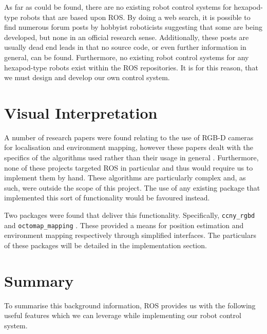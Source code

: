 As far as could be found, there are no existing robot control systems for hexapod-type robots that are based upon ROS. By doing a web search, it is possible to find numerous forum posts by hobbyist roboticists suggesting that some are being developed, but none in an official research sense. Additionally, these posts are usually dead end leads in that no source code, or even further information in general, can be found. Furthermore, no existing robot control systems for any hexapod-type robots exist within the ROS repositories. It is for this reason, that we must design and develop our own control system.


\section{Visual Interpretation}

A number of research papers were found relating to the use of RGB-D cameras for localisation and environment mapping, however these papers dealt with the specifics of the algorithms used rather than their usage in general \cite{correa2012mobile, biswas2012depth, cunha2011using}. Furthermore, none of these projects targeted ROS in particular and thus would require us to implement them by hand. These algorithms are particularly complex and, as such, were outside the scope of this project. The use of any existing package that implemented this sort of functionality would be favoured instead.

Two packages were found that deliver this functionality. Specifically, \texttt{ccny\_rgbd} and \texttt{octomap\_mapping} \cite{ccny_rgbd, ros_wiki_octomap}. These provided a means for position estimation and environment mapping respectively through simplified interfaces. The particulars of these packages will be detailed in the implementation section.


\section{Summary}

To summarise this background information, ROS provides us with the following useful features which we can leverage while implementing our robot control system.

